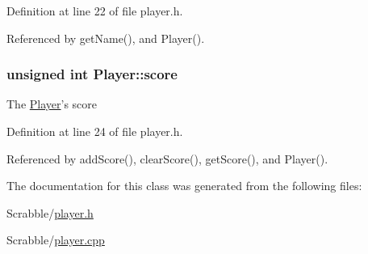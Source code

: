 Definition at line 22 of file player.\-h.



Referenced by get\-Name(), and Player().

\hypertarget{class_player_a38a6dafe988a768a435cc0a9fde38e46}{
\subsubsection[{score}]{\setlength{\rightskip}{0pt plus 5cm}unsigned int Player\-::score\hspace{0.3cm}{\ttfamily [protected]}}}\label{class_player_a38a6dafe988a768a435cc0a9fde38e46}
The \hyperlink{class_player}{Player}'s score 

Definition at line 24 of file player.\-h.



Referenced by add\-Score(), clear\-Score(), get\-Score(), and Player().



The documentation for this class was generated from the following files\-:\begin{DoxyCompactItemize}
\item 
Scrabble/\hyperlink{player_8h}{player.\-h}\item 
Scrabble/\hyperlink{player_8cpp}{player.\-cpp}\end{DoxyCompactItemize}
